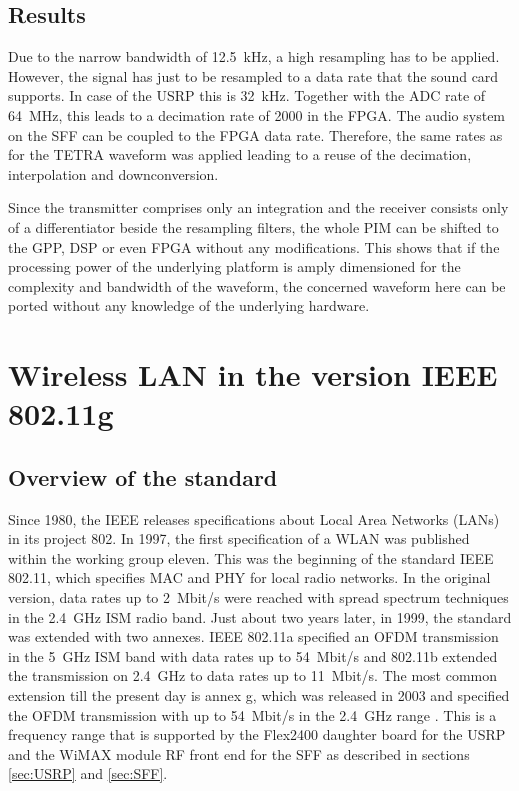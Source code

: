 \subsection{Results}
Due to the narrow bandwidth of \SI{12.5}{kHz}, a high resampling has to be applied. However, the signal has just to be resampled to a data rate that the sound card supports. In case of the USRP this is \SI{32}{kHz}. Together with the ADC rate of \SI{64}{MHz}, this leads to a decimation rate of 2000 in the FPGA. The audio system on the SFF can be coupled to the FPGA data rate. Therefore, the same rates as for the TETRA waveform was applied leading to a reuse of the decimation, interpolation and downconversion.

Since the transmitter comprises only an integration and the receiver consists only of a differentiator beside the resampling filters, the whole \ac{PIM} can be shifted to the GPP, DSP or even FPGA without any modifications. This shows that if the processing power of the underlying platform is amply dimensioned for the complexity and bandwidth of the waveform, the concerned waveform here can be ported without any knowledge of the underlying hardware.


\section{Wireless LAN in the version IEEE 802.11g}

\subsection{Overview of the standard}
Since 1980, the \ac{IEEE} releases specifications about Local Area Networks (LANs) in its project 802. In 1997, the first specification of a \ac{WLAN} was published within the working group eleven. This was the beginning of the standard IEEE 802.11, which specifies \ac{MAC} and \ac{PHY} for local radio networks. In the original version, data rates up to \SI{2}{Mbit/s} were reached with spread spectrum techniques in the \SI{2.4}{GHz} \ac{ISM} radio band. Just about two years later, in 1999, the standard was extended with two annexes. IEEE 802.11a specified an \ac{OFDM} transmission in the \SI{5}{GHz} \ac{ISM} band with data rates up to \SI{54}{Mbit/s} and 802.11b extended the transmission on \SI{2.4}{GHz} to data rates up to \SI{11}{Mbit/s}. The most common extension till the present day is annex g, which was released in 2003 and specified the \ac{OFDM} transmission with up to \SI{54}{Mbit/s} in the \SI{2.4}{GHz} range \cite{IEEE802.11}. This is a frequency range that is supported by the Flex2400 daughter board for the USRP and the WiMAX module RF front end for the SFF as described in sections \ref{sec:USRP} and \ref{sec:SFF}.

